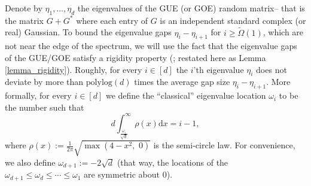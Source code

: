 \documentclass[11pt,letterpaper]{article}
\begin{document}
Denote by $\eta_1,\ldots, \eta_d$ the eigenvalues of the GUE (or GOE) random matrix-- that is the matrix $G+G^\ast$ where each entry of $G$ is an independent standard complex (or real) Gaussian.
%
To bound the eigenvalue gaps $\eta_i-\eta_{i+1}$ for $i \geq \tilde{\Omega}(1)$, which are not near the edge of the spectrum, 
we will use the fact that
%
the eigenvalue gaps of the GUE/GOE satisfy a rigidity property (\cite{erdHos2012rigidity}; restated here as Lemma \ref{lemma_rigidity}).
Roughly, for every $i \in [d]$ the $i$'th eigenvalue $\eta_i$ does not deviate by more than $\mathrm{polylog}(d)$ times the average gap size $\eta_i - \eta_{i+1}.
$
%
More formally, for every $i\in [d]$ we define the ``classical'' eigenvalue location $\omega_i$ to be the number such that
%
\begin{equation}\label{eq_a7}
      d\int_{\frac{\omega_i}{\sqrt{d}}}^{\infty}\rho(x) \mathrm{d}x = i - 1,
\end{equation}
%
where $\rho(x):= \frac{1}{2\pi}\sqrt{\max(4 - x^2, \,\, 0)}$ is the semi-circle law.
%
For convenience, we also define $\omega_{d+1} := -2 \sqrt{d}$ (that way, the locations of the  $\omega_{d+1} \leq \omega_d \leq \cdots \leq \omega_1$  are symmetric about $0$).
\end{document}
